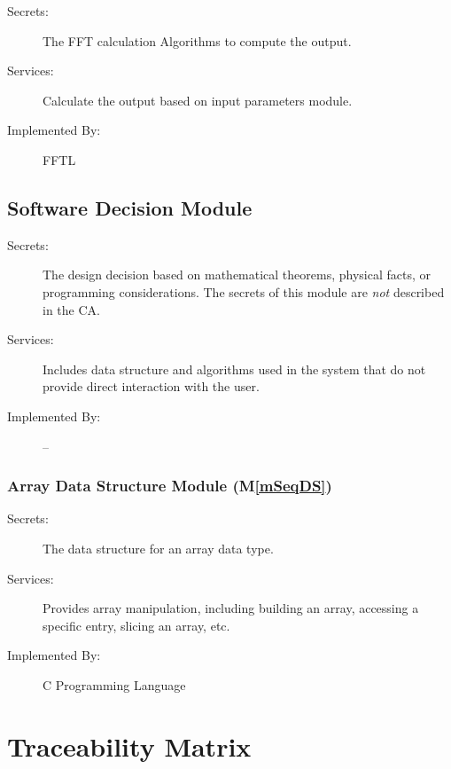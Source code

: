 \documentclass[12pt, titlepage]{article}
\newcommand{\mref}[1]{M\ref{#1}}
\begin{document}
\begin{description}
\item[Secrets:] The FFT calculation Algorithms to compute the output.
\item[Services:] Calculate the output based on input parameters module.
\item[Implemented By:] FFTL
\end{description} 
 

\subsection{Software Decision Module}

\begin{description}
\item[Secrets:] The design decision based on mathematical theorems, physical
  facts, or programming considerations. The secrets of this module are
  \emph{not} described in the CA.
\item[Services:] Includes data structure and algorithms used in the system that
  do not provide direct interaction with the user. 
\item[Implemented By:] --
\end{description}

\subsubsection{Array Data Structure Module (\mref{mSeqDS})}

\begin{description}
\item[Secrets:] The data structure for an array data type.
\item[Services:] Provides array manipulation, including building an array,
  accessing a specific entry, slicing an array, etc.
\item[Implemented By:] C Programming Language 
\end{description}


\section{Traceability Matrix} \label{SecTM}
\end{document}
